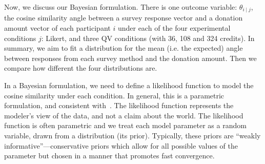 
 
Now, we discuss our Bayesian formulation. There is one outcome variable: $\theta_{i \mid j}$, the cosine similarity angle between a survey response vector and a donation amount vector of each participant $i$  under each of the four experimental conditions $j$: Likert, and three QV conditions (with 36, 108 and 324 credits). In summary, we aim to fit a distribution for the mean (i.e. the expected) angle between responses from each survey method and the donation amount. Then we compare how different the four distributions are. 

In a Bayesian formulation, we need to define a likelihood function to model the cosine similarity under each condition. In general, this is a parametric formulation, and consistent with~\textcite{McElreath2015}. The likelihood function represents the modeler's view of the data, and not a claim about the world. The likelihood function is often parametric and we treat each model parameter as a random variable, drawn from a distribution (its prior). Typically, these priors are ``weakly informative''---conservative priors which allow for all possible values of the parameter but chosen in a manner that promotes fast convergence.



